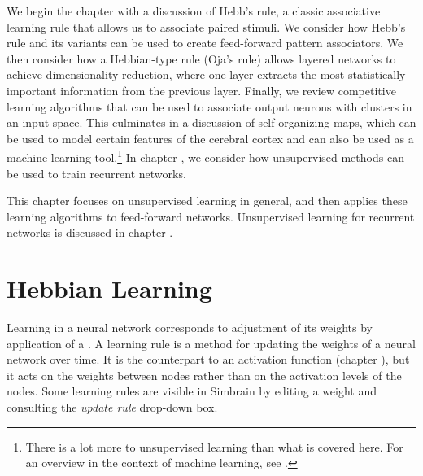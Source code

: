 We begin the chapter with a discussion of Hebb's rule, a classic associative learning rule that allows us to associate paired stimuli. We consider how Hebb's rule and its variants can be used to create feed-forward pattern associators. We then consider how a Hebbian-type rule (Oja's rule) allows layered networks to achieve dimensionality reduction, where one layer extracts the most statistically important information from the previous layer. Finally, we review competitive learning algorithms that can be used to associate output neurons with clusters in an input space. This culminates in a discussion of self-organizing maps, which can be used to model certain features of the cerebral cortex and can also be used as a machine learning tool.\footnote{There is a lot more to unsupervised learning than what is covered here. For an overview in the context of machine learning, see .}  In chapter , we consider how unsupervised methods can be used to train recurrent networks.

This chapter focuses on unsupervised learning in general, and then applies these learning algorithms to feed-forward networks.  Unsupervised learning for recurrent networks is discussed in chapter .

\section{Hebbian Learning}


Learning in a neural network corresponds to adjustment of its weights by application of a . A learning rule is a method for updating the weights of a neural network over time. It is the counterpart to an activation function (chapter ), but it acts on the weights between nodes rather than on the activation levels of the nodes.  Some learning rules are visible in Simbrain by editing a weight and consulting the \emph{update  rule} drop-down box.

